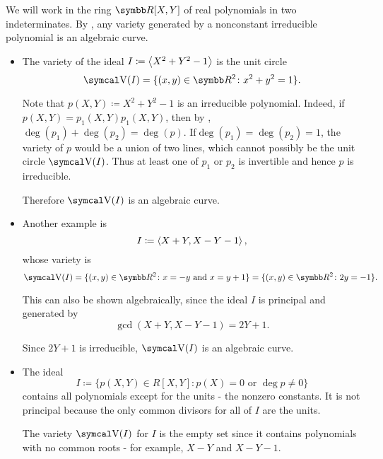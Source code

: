 \begin{example}\label{ex:affine_varieties}
  We will work in the ring \( \BR[X, Y] \) of real polynomials in two indeterminates. By , any variety generated by a nonconstant irreducible polynomial is an algebraic curve.

  \begin{itemize}
    \item The variety of the ideal \( I \coloneqq \left\langle X^2 + Y^2 - 1 \right\rangle \) is the unit circle
    \begin{equation*}
      \CV(I) = \{ (x, y) \in \BR^2 \colon x^2 + y^2 = 1 \}.
    \end{equation*}

    Note that \( p(X, Y) \coloneqq X^2 + Y^2 - 1 \) is an irreducible polynomial. Indeed, if \( p(X, Y) = p_1(X, Y) p_1(X, Y) \), then by , \( \deg(p_1) + \deg(p_2) = \deg(p) \). If\LEM \( \deg(p_1) = \deg(p_2) = 1 \), the variety of \( p \) would be a union of two lines, which cannot possibly be the unit circle \( \CV(I) \). Thus at least one of \( p_1 \) or \( p_2 \) is invertible and hence \( p \) is irreducible.

    Therefore \( \CV(I) \) is an algebraic curve.

    \item Another example is
    \begin{equation*}
      I \coloneqq \left\langle X + Y, X - Y - 1 \right\rangle,
    \end{equation*}
    whose variety is
    \begin{equation*}
      \CV(I) = \{ (x, y) \in \BR^2 \colon x = -y \text{ and } x = y + 1 \} = \{ (x, y) \in \BR^2 \colon 2y = -1 \}.
    \end{equation*}

    This can also be shown algebraically, since the ideal \( I \) is principal and generated by
    \begin{equation*}
      \gcd(X + Y, X - Y - 1) = 2Y + 1.
    \end{equation*}

    Since \( 2Y + 1 \) is irreducible, \( \CV(I) \) is an algebraic curve.

    \item The ideal
    \begin{equation*}
      I \coloneqq \{ p(X, Y) \in R[X, Y] \colon p(X) = 0 \text{ or } \deg p \neq 0 \}
    \end{equation*}
    contains all polynomials except for the units - the nonzero constants. It is not principal because the only common divisors for all of \( I \) are the units.

    The variety \( \CV(I) \) for \( I \) is the empty set since it contains polynomials with no common roots - for example, \( X - Y \) and \( X - Y - 1 \).
  \end{itemize}
\end{example}

